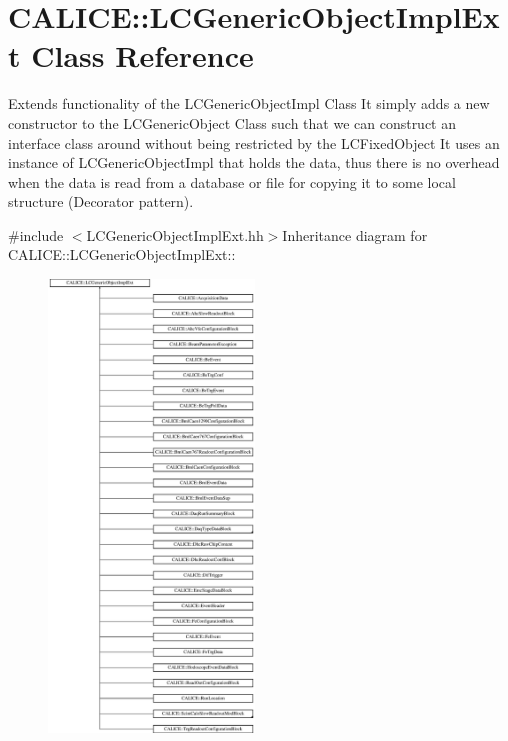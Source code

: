 \section{CALICE::LCGenericObjectImplExt Class Reference}
\label{classCALICE_1_1LCGenericObjectImplExt}


Extends functionality of the LCGenericObjectImpl Class It simply adds a new constructor to the LCGenericObject Class such that we can construct an interface class around without being restricted by the LCFixedObject It uses an instance of LCGenericObjectImpl that holds the data, thus there is no overhead when the data is read from a database or file for copying it to some local structure (Decorator pattern).  


{\ttfamily \#include $<$LCGenericObjectImplExt.hh$>$}Inheritance diagram for CALICE::LCGenericObjectImplExt::\begin{figure}[H]
\begin{center}
\leavevmode
\includegraphics[height=12cm]{classCALICE_1_1LCGenericObjectImplExt}
\end{center}
\end{figure}
